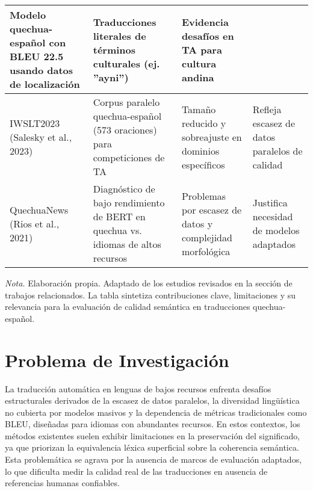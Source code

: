 \begin{table}[htbp]
\begin{tabularx}{\textwidth}{|p{3cm}|>{\raggedright\arraybackslash}X|>{\raggedright\arraybackslash}X|>{\raggedright\arraybackslash}X|}
		Modelo quechua-español con BLEU 22.5 usando datos de localización                                   &
		Traducciones literales de términos culturales (ej. ''ayni'')                                        &
		Evidencia desafíos en TA para cultura andina                                                                                                                                                                    \\
		\hline
		IWSLT2023 \newline (Salesky et al., 2023)                                                           &
		Corpus paralelo quechua-español (573 oraciones) para competiciones de TA                            &
		Tamaño reducido y sobreajuste en dominios específicos                                               &
		Refleja escasez de datos paralelos de calidad                                                                                                                                                                   \\
		\hline
		QuechuaNews \newline (Rios et al., 2021)                                                            &
		Diagnóstico de bajo rendimiento de BERT en quechua vs. idiomas de altos recursos                    &
		Problemas por escasez de datos y complejidad morfológica                                            &
		Justifica necesidad de modelos adaptados                                                                                                                                                                        \\
		\hline
	\end{tabularx}

	\vspace{0.5cm}
	\footnotesize
	\textit{Nota.}  Elaboración propia. Adaptado de los estudios revisados en la sección de trabajos relacionados. La tabla sintetiza contribuciones clave, limitaciones y su relevancia para la evaluación de calidad semántica en traducciones quechua-español.
\end{table}

\section{Problema de Investigación}

La traducción automática en lenguas de bajos recursos enfrenta desafíos estructurales derivados de la escasez de datos paralelos, la diversidad lingüística no cubierta por modelos masivos y la dependencia de métricas tradicionales como BLEU, diseñadas para idiomas con abundantes recursos. En estos contextos, los métodos existentes suelen exhibir limitaciones en la preservación del significado, ya que priorizan la equivalencia léxica superficial sobre la coherencia semántica. Esta problemática se agrava por la ausencia de marcos de evaluación adaptados, lo que dificulta medir la calidad real de las traducciones en ausencia de referencias humanas confiables.

